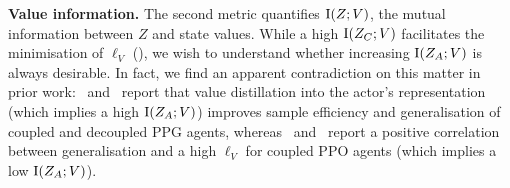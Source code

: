 
\textbf{Value information.} The second metric quantifies $\text{I}(Z;V)$, the mutual information between $Z$ and state values. While a high $\text{I}(Z_C;V)$ facilitates the minimisation of $\ell_V$ (), we wish to understand whether increasing $\text{I}(Z_A;V)$ is always desirable. In fact, we find an apparent contradiction on this matter in prior work:~\citet{PPG} and~\citet{KaixinPPG} report that value distillation into the actor's representation (which implies a high $\text{I}(Z_A;V)$) improves sample efficiency and generalisation of coupled and decoupled PPG agents, whereas~\citet{raileanu2021decoupling} and~\citet{garcin2024dred} report a positive correlation between generalisation and a high $\ell_V$ for coupled PPO agents (which implies a low $\text{I}(Z_A;V)$). %

